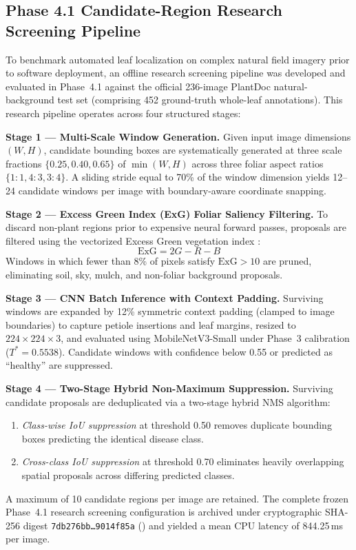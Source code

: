 \documentclass[pdflatex,sn-mathphys-num]{sn-jnl}
\theoremstyle{thmstyleone}%
\theoremstyle{thmstyletwo}%
\theoremstyle{thmstylethree}%
\begin{document}
\subsection{Phase 4.1 Candidate-Region Research Screening Pipeline}
\label{sec:screening_pipeline}

To benchmark automated leaf localization on complex natural field imagery prior to software deployment, an offline research screening pipeline was developed and evaluated in Phase~4.1 against the official 236-image PlantDoc natural-background test set (comprising 452 ground-truth whole-leaf annotations). This research pipeline operates across four structured stages:

\textbf{Stage 1 — Multi-Scale Window Generation.}
Given input image dimensions $(W, H)$, candidate bounding boxes are systematically generated at three scale fractions $\{0.25, 0.40, 0.65\}$ of $\min(W, H)$ across three foliar aspect ratios $\{1{:}1, 4{:}3, 3{:}4\}$. A sliding stride equal to 70\% of the window dimension yields 12--24 candidate windows per image with boundary-aware coordinate snapping.

\textbf{Stage 2 — Excess Green Index (ExG) Foliar Saliency Filtering.}
To discard non-plant regions prior to expensive neural forward passes, proposals are filtered using the vectorized Excess Green vegetation index \citep{woebbecke1995color}:
\begin{equation}
  \text{ExG} = 2G - R - B
  \label{eq:exg}
\end{equation}
Windows in which fewer than 8\% of pixels satisfy $\text{ExG} > 10$ are pruned, eliminating soil, sky, mulch, and non-foliar background proposals.

\textbf{Stage 3 — CNN Batch Inference with Context Padding.}
Surviving windows are expanded by 12\% symmetric context padding (clamped to image boundaries) to capture petiole insertions and leaf margins, resized to $224 \times 224 \times 3$, and evaluated using MobileNetV3-Small under Phase~3 calibration ($T^* = 0.5538$). Candidate windows with confidence below 0.55 or predicted as ``healthy'' are suppressed.

\textbf{Stage 4 — Two-Stage Hybrid Non-Maximum Suppression.}
Surviving candidate proposals are deduplicated via a two-stage hybrid NMS algorithm:
\begin{enumerate}
  \item \textit{Class-wise IoU suppression} at threshold 0.50 removes duplicate bounding boxes predicting the identical disease class.
  \item \textit{Cross-class IoU suppression} at threshold 0.70 eliminates heavily overlapping spatial proposals across differing predicted classes.
\end{enumerate}
A maximum of 10 candidate regions per image are retained. The complete frozen Phase~4.1 research screening configuration is archived under cryptographic SHA-256 digest \texttt{7db276bb\dots 9014f85a} () and yielded a mean CPU latency of 844.25\,ms per image.
\end{document}

